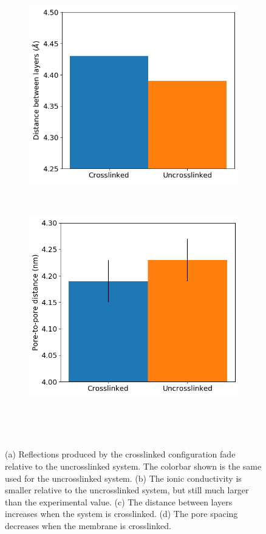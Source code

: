 \documentclass{article}
\begin{document}
\begin{figure}
\begin{subfigure}{0.45\textwidth}
	\includegraphics[width=\textwidth]{dbwl_xlink.png}
	\caption{}~\label{fig:dbwl_xlink}
  \end{subfigure}
  \begin{subfigure}{0.45\textwidth}
	\centering
	\includegraphics[width=\textwidth]{p2p_xlink.png}
	\caption{}~\label{fig:p2p_xlink}
  \end{subfigure}
  \caption{(a) Reflections produced by the crosslinked configuration fade relative
  to the uncrosslinked system. The colorbar shown is the same used for the uncrosslinked
  system. (b) The ionic conductivity is smaller relative to the uncrosslinked system, but
  still much larger than the experimental value. (c) The distance between layers increases
  when the system is crosslinked. (d) The pore spacing decreases when the membrane is 
  crosslinked.}~\label{fig:xlink}
  \end{figure}
 
\end{document}

